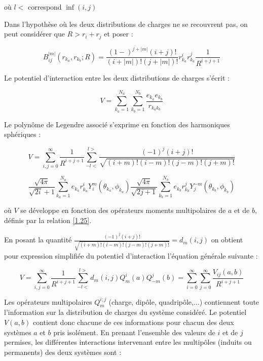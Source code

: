 \documentclass[12pt,a4paper]{book}
\begin{document}
	\noindent où $l<$ correspond $\inf (i,j)$
	
	
	Dans l'hypothèse où les deux distributions de charges ne se recouvrent pas, on peut considérer que $R> r_{i} +r_{j}$ et poser : 
	
	\begin{equation}
	B_{ij}^{|m|}(r_{k_{a}}, r_{k_{b}}; R) = \frac{(1-)^{j+|m|} (i+j)!}{(i+|m|)! (j+|m|)!} r^{i}_{k_{a}} r_{k_{a}}^{j} \frac{1}{R^{i+j+1}}
	\end{equation}
	
	Le potentiel d'interaction entre les deux distributions de charges s'écrit : 
	
	\begin{equation}
	V = \sum_{k_{a}=1}^{N_{a}} \sum_{k_{b}=1}^{N_{b}} \frac{e_{k_{a}}e_{k_{b}}}{r_{k_{a}k_{b}}}
	\end{equation}
	
	
	Le polynôme de Legendre associé s'exprime en fonction des harmoniques sphériques : 
	
	\begin{equation}
	V = \sum_{i,j=0}^{\infty} \frac{1}{R^{i+j+1}} \sum_{-l<}^{l>} \frac{(-1)^{j} (i+j)!} {\sqrt{(i+m)! (i-m)! (j-m)! (j+m)!}}
	\end{equation}
	
	\begin{equation}
	\frac{\sqrt{4\pi}}{\sqrt{2i}+ 1} \sum_{k_{a}=1}^{N_{a}} e_{k_{a}} r_{k_{a}}^{i} Y_{i}^{m} (\theta_{k_{a}},\phi_{k_{a}}) \frac{\sqrt{4\pi}}{\sqrt{2j+ 1}} \sum_{k_{b}=1}^{N_{b}} e_{k_{b}}r_{k_{b}}^{j} Y_{j}^{-m}(\theta_{k_{b}},\phi_{k_{b}})
	\end{equation}
	
	\noindent où $V$ se développe en fonction des opérateurs moments multipolaires de $a$ et de $b$, définis par la relation \ref{1.25}.
	
	En posant la quantité $\frac{(-1)^{j} (i+j)!} {\sqrt{(i+m)! (i-m)! (j-m)! (j+m)!}}=d_{m}(i,j)$ on obtient pour expression simplifiée du potentiel d'interaction l'équation générale suivante : 
	
	\begin{equation}
	V = \sum_{i,j=0}^{\infty} \frac{1}{R^{i+j+1}} \sum_{-l<}^{l>} d_{m}(i,j) Q_{m}^{i}(a) Q_{-m}^{j} (b) = \sum_{i=0}^{\infty} \sum_{j=0}^{\infty} \frac{V_{ij}(a,b)}{R^{i+j+1}} \label{1.33}
	\end{equation}
	
	Les opérateurs multipolaires $Q_{m}^{i;j}$ (charge, dipôle, quadripôle,...) contiennent toute l'information sur la distribution de charges du système considéré. Le potentiel $V(a,b)$ contient donc chacune de ces informations pour chacun des deux systèmes $a$ et $b$ pris isolément. En prenant l'ensemble des valeurs de $i$ et de $j$ permises, les différentes interactions intervenant entre les multipôles (induits ou permanents) des deux systèmes sont :
	
\end{document}

